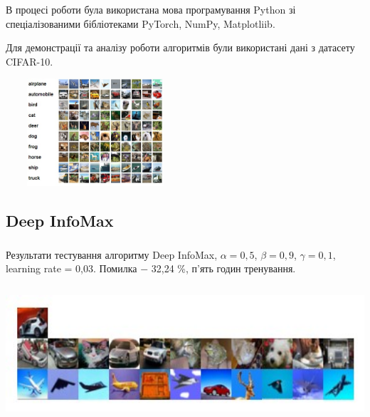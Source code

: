 \documentclass[c]{beamer}
\begin{document}
\begin{frame}
	\frametitle{\insertsection}
	
	В процесі роботи була використана мова програмування Python зі спеціалізованими бібліотеками PyTorch, NumPy, Matplotliib.\pause
	
	
	Для демонстрації та аналізу роботи алгоритмів були використані дані з датасету CIFAR-10.


  	\centering\includegraphics[width=0.5\textwidth, height=4cm, natwidth=471, natheight=370]{cifar10.jpg}

\end{frame}

\subsection{Deep InfoMax}

\begin{frame}
	\frametitle{\insertsection}
	\framesubtitle{\insertsubsection}

	Результати тестування алгоритму Deep InfoMax, $\alpha = 0,5$, $\beta = 0,9$, $\gamma = 0,1$, learning rate = 0,03. Помилка $-$ 32,24 \%, п'ять годин тренування.
		
    \includegraphics[width=\textwidth, height=5cm, natwidth=375, natheight=121]{deepinfodemo3.jpg}


\end{frame}
\end{document}
